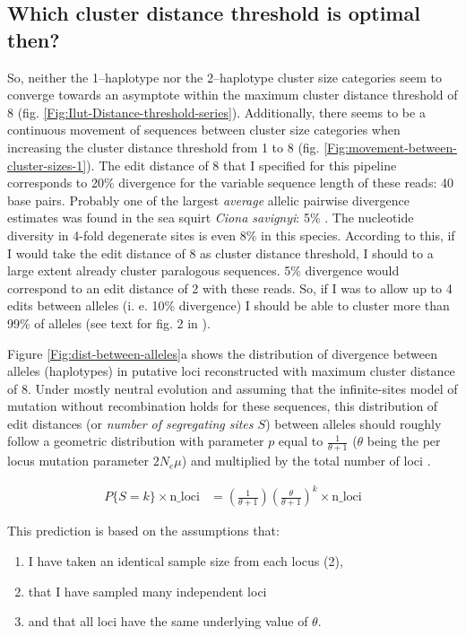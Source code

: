 \documentclass{article}\usepackage[]{graphicx}\usepackage[]{color}
\begin{document}
\subsection{Which cluster distance threshold is optimal then?}
So, neither the 1--haplotype nor the 2--haplotype cluster size categories seem to converge towards an asymptote within the maximum cluster distance threshold of 8 (fig. \ref{Fig:Ilut-Distance-threshold-series}). Additionally, there seems to be a continuous movement of sequences between cluster size categories when increasing the cluster distance threshold from 1 to 8 (fig. \ref{Fig:movement-between-cluster-sizes-1}). The edit distance of 8 that I specified for this pipeline corresponds to 20\% divergence for the variable sequence length of these reads: 40 base pairs. Probably one of the largest \emph{average} allelic pairwise divergence estimates was found in the sea squirt \textit{Ciona savignyi}: 5\% \citep{Small2007}. The nucleotide diversity in 4-fold degenerate sites is even 8\% in this species. According to this, if I would take the edit distance of 8 as cluster distance threshold, I should to a large extent already cluster paralogous sequences. 5\% divergence would correspond to an edit distance of 2 with these reads. So, if I was to allow up to 4 edits between alleles (i. e. 10\% divergence) I should be able to cluster more than 99\% of alleles (see text for fig. 2 in \citealt{Small2007}). 

Figure \ref{Fig:dist-between-alleles}a shows the distribution of divergence between alleles (haplotypes) in putative loci reconstructed with maximum cluster distance of 8. 
Under mostly neutral evolution and assuming that the infinite-sites model of mutation without recombination holds for these sequences, this distribution of edit distances (or \emph{number of segregating sites $S$}) between alleles should roughly follow a geometric distribution with parameter $p$ equal to $\frac{1}{\theta +1}$ ($\theta$ being the per locus mutation parameter $2N_{e}\mu$) and multiplied by the total number of loci \citep[sec. 4.1.1 ]{Wakeley2009}.

\begin{align}
P\{S=k\} \times \text{n\_loci} &= \left( \frac{1}{\theta+1} \right) \left( \frac{\theta}{\theta+1} \right)^{k} \times \text{n\_loci}
\end{align}


This prediction is based on the assumptions that:
\begin{enumerate}
\item I have taken an identical sample size from each locus (2), 
\item that I have sampled many independent loci 
\item and that all loci have the same underlying value of $\theta$.
\end{enumerate}
\end{document}
